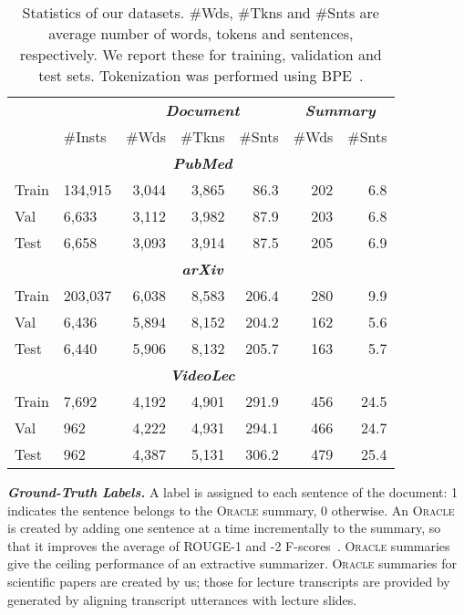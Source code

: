 \documentclass[11pt]{article}
\begin{document}
\begin{table}[t]
\setlength{\tabcolsep}{4pt}
\renewcommand{\arraystretch}{1.1}
\centering
\begin{footnotesize} 
\begin{tabular}{|ll|rrr|rr|}
\hline
\multicolumn{2}{|c|}{} & \multicolumn{3}{c|}{\textbf{\textsl{Document}}} & \multicolumn{2}{c|}{\textbf{\textsl{Summary}}} \\
 & \#Insts & \#Wds & \#Tkns & \#Snts& \#Wds & \#Snts \\
\hline
\hline
\rowcolor{gray!10}
& & \multicolumn{3}{c|}{\textsl{\textbf{PubMed}}} & & \\
Train & 134,915 & 3,044 & 3,865 & 86.3 & 202 & 6.8 \\
Val & 6,633 & 3,112 & 3,982 & 87.9 & 203 & 6.8 \\
Test & 6,658 & 3,093 & 3,914 & 87.5 & 205 & 6.9 \\
\hline
\hline
\rowcolor{gray!10}
& & \multicolumn{3}{c|}{\textsl{\textbf{arXiv}}} & & \\
Train & 203,037 & 6,038 & 8,583 & 206.4 & 280 & 9.9 \\
Val & 6,436 & 5,894 & 8,152 & 204.2 & 162 & 5.6 \\
Test & 6,440 & 5,906 & 8,132 & 205.7 & 163 & 5.7 \\
\hline
\hline
\rowcolor{gray!10}
& & \multicolumn{3}{c|}{\textsl{\textbf{VideoLec}}} & & \\
Train & 7,692 & 4,192 & 4,901 & 291.9 & 456 & 24.5 \\
Val & 962 & 4,222 & 4,931 & 294.1 & 466 & 24.7 \\
Test & 962 & 4,387 & 5,131 & 306.2 & 479 & 25.4 \\
\hline
\end{tabular}
\end{footnotesize}
\caption{Statistics of our datasets.
\#Wds, \#Tkns and \#Snts are average number of words, tokens and sentences, respectively.
We report these for training, validation and test sets.
Tokenization was performed using BPE~\cite{sennrich-etal-2016-neural}.}
\label{tab:dataset_stat}
\end{table}




\vspace{0.04in}
\noindent\textbf{\textsl{Ground-Truth Labels.}}\quad
A label  is assigned to each sentence of the document:
1 indicates the sentence belongs to the \textsc{Oracle} summary, 0 otherwise.
An \textsc{Oracle} is created by adding one sentence at a time incrementally to the summary, so that it improves the average of ROUGE-1 and -2 F-scores~\cite{kedzie-etal-2018-content}.
\textsc{Oracle} summaries give the ceiling performance of an extractive summarizer. 
\textsc{Oracle} summaries for scientific papers are created by us; those for lecture transcripts are provided by \citet{lv2021vt} generated by aligning transcript utterances with lecture slides. 
\end{document}
